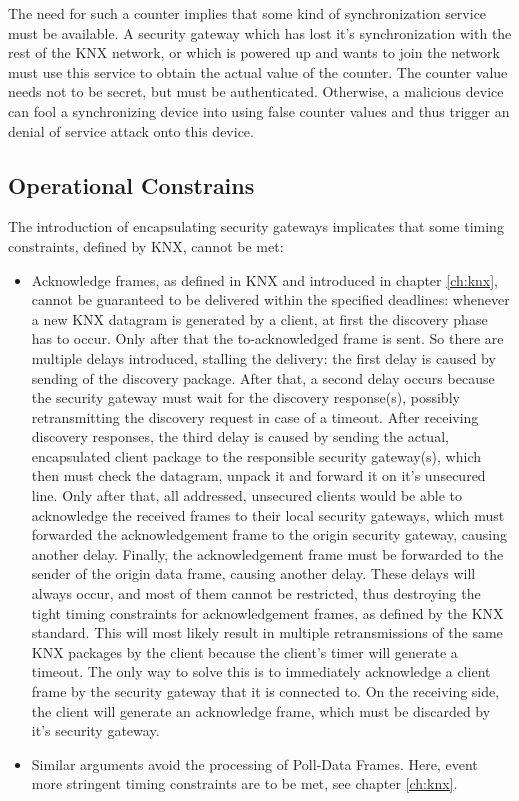 The need for such a counter implies that some kind of synchronization service must be available.
A security gateway which has lost it's synchronization with the rest of the KNX network, or which is powered up and wants to join the network must use this
service to obtain the actual value of the counter. The counter value needs not to be secret, but must be authenticated. Otherwise, a malicious device can
fool a synchronizing device into using false counter values and thus trigger an denial of service attack onto this device.

\subsection{Operational Constrains}

The introduction of encapsulating security gateways implicates that some timing constraints, defined by KNX, cannot be met:

\begin{itemize}
 \item Acknowledge frames, as defined in KNX and introduced in chapter \ref{ch:knx}, cannot be guaranteed to be delivered within the specified deadlines: whenever
 a new KNX datagram is generated by a client, at first the discovery phase has to occur. Only after that the to-acknowledged frame is sent. So there are
 multiple delays introduced, stalling the delivery: the first delay is caused by sending of the discovery package.
 After that, a second delay occurs because the security gateway must wait for the discovery response(s), possibly retransmitting the discovery request
 in case of a timeout. After receiving discovery responses, the third delay is caused by sending the actual, encapsulated
 client package to the responsible security gateway(s), which then must check the datagram, unpack it and forward it on it's unsecured line.
 Only after that, all addressed, unsecured clients would be able to acknowledge the received frames
 to their local security gateways,
 which must forwarded the acknowledgement frame to the origin security gateway, causing another delay. Finally, the acknowledgement frame must be forwarded to the sender of
 the origin data frame, causing another delay.
 These delays will always occur, and most of them cannot be restricted, thus destroying the tight timing constraints for acknowledgement frames, as defined
 by the KNX standard. This
 will most likely result in multiple retransmissions of the same KNX packages
 by the client because the client's timer will generate a timeout. The only way to solve this is to immediately acknowledge a client frame by the security
 gateway that it is connected to. On the receiving side, the client will generate an acknowledge
 frame, which must be discarded by it's security gateway.
 \item Similar arguments avoid the processing of Poll-Data Frames. Here, event more stringent timing constraints are to be met, see chapter \ref{ch:knx}. 
\end{itemize}

